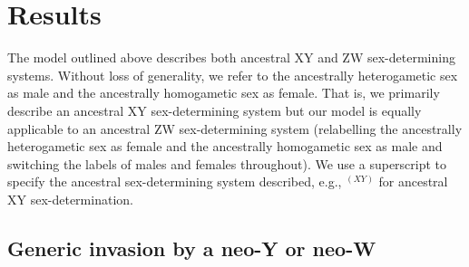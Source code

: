 \documentclass[10pt,letterpaper]{article}
\providecommand{\DIFaddtex}[1]{{\protect\color{blue}\uwave{#1}}} %
\providecommand{\DIFaddbegin}{} %
\providecommand{\DIFadd}[1]{\texorpdfstring{\DIFaddtex{#1}}{#1}} %
\newcommand{\DIFaddincludegraphics}[2][]{{\color{blue}\fbox{\DIFOincludegraphics[#1]{#2}}}} %
\DeclareRobustCommand{\DIFaddbegin}{\DIFOaddbegin \let\includegraphics\DIFaddincludegraphics} %
\begin{document}
\section*{Results}

The model outlined above describes both ancestral XY and ZW sex-determining systems. %
Without loss of generality, we refer to the ancestrally heterogametic sex as male and the ancestrally homogametic sex as female.
That is, we primarily describe an ancestral XY sex-determining system but our model is equally applicable to an ancestral ZW sex-determining system (relabelling the ancestrally heterogametic sex as female and the ancestrally homogametic sex as male and switching the labels of males and females throughout). 
We use a superscript to specify the ancestral sex-determining system described, e.g., $^{(XY)}$ for ancestral XY sex-determination.

\subsection*{Generic invasion by a neo-Y or neo-W}

\DIFaddbegin \DIFadd{\textcolor{red}{Discussion of `epistatic dominance' assumption to go here somewhere? The model in the Mathematica file is actual general to this assumption I think (or at least we wrote one that is), which we could mention in the response.}
}
\end{document}
